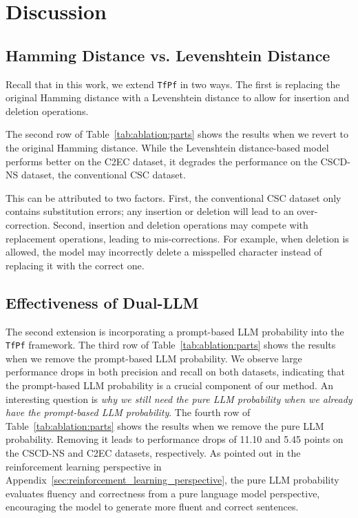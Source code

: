 \section{Discussion}
\label{sec:analysis:finetuning}

\subsection{Hamming Distance vs. Levenshtein Distance}
Recall that in this work, we extend \texttt{TfPf} in two ways.
The first is replacing the original Hamming distance with a Levenshtein distance to allow for insertion and deletion operations.

The second row of Table~\ref{tab:ablation:parts} shows the results when we revert to the original Hamming distance.
While the Levenshtein distance-based model performs better on the C2EC dataset, it degrades the performance on the CSCD-NS dataset, the conventional CSC dataset.

This can be attributed to two factors.
First, the conventional CSC dataset only contains substitution errors; any insertion or deletion will lead to an over-correction.
Second, insertion and deletion operations may compete with replacement operations, leading to mis-corrections.
For example, when deletion is allowed, the model may incorrectly delete a misspelled character instead of replacing it with the correct one.


\subsection{Effectiveness of Dual-LLM}
\label{sec:analysis:prompt}
The second extension is incorporating a prompt-based LLM probability into the \texttt{TfPf} framework.
The third row of Table~\ref{tab:ablation:parts} shows the results when we remove the prompt-based LLM probability.
We observe large performance drops in both precision and recall on both datasets, indicating that the prompt-based LLM probability is a crucial component of our method.
An interesting question is \textit{why we still need the pure LLM probability when we already have the prompt-based LLM probability}.
The fourth row of Table~\ref{tab:ablation:parts} shows the results when we remove the pure LLM probability.
Removing it leads to performance drops of 11.10 and 5.45 points on the CSCD-NS and C2EC datasets, respectively.
As pointed out in the reinforcement learning perspective in Appendix~\ref{sec:reinforcement_learning_perspective}, the pure LLM probability evaluates fluency and correctness from a pure language model perspective, encouraging the model to generate more fluent and correct sentences.


